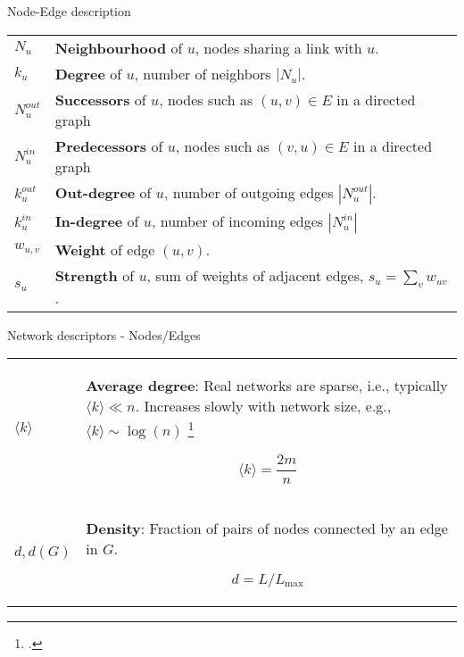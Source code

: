 \begin{textbox}{Node-Edge description}
    \begin{tabular}{p{}|p{}}\scriptsize

        $N_u$       & \textbf{Neighbourhood} of $u$, nodes sharing a link with $u$.                      \\


        $k_u$       & \textbf{Degree} of $u$, number of neighbors $|N_u|$.                               \\
        \hline
        $N^{out}_u$ & \textbf{Successors} of $u$, nodes such as $(u,v)\in E$ in a directed graph         \\

        $N^{in}_u$  & \textbf{Predecessors} of $u$, nodes such as $(v,u)\in E$ in a directed graph       \\

        $k^{out}_u$ & \textbf{Out-degree} of $u$, number of outgoing edges  $|N^{out}_u|$.               \\

        $k^{in}_u$  & \textbf{In-degree} of $u$, number of incoming edges $|N^{in}_u|$                   \\

        \hline

        $w_{u,v}$   & \textbf{Weight} of edge $(u,v)$.                                                   \\

        $s_u$       & \textbf{Strength} of $u$, sum of weights of adjacent edges, $s_u = \sum_v w_{uv}$. \\
    \end{tabular}

\end{textbox}

\begin{textbox}{Network descriptors - Nodes/Edges}
    \begin{tabular}{p{}|p{}}\scriptsize

        $\langle k \rangle$ & \textbf{Average degree}:
        Real networks are sparse, i.e., typically $\langle k \rangle \ll n$. Increases slowly with network size, e.g., $\langle k \rangle \sim \log(n)$ \footcite{leskovec2005graphs}

        \[\langle k \rangle=\frac{2m}{n}\]                                                              \\

        $d,d(G)$            & \textbf{Density}: Fraction of pairs of nodes connected by an edge in $G$.

        \[d=L/L_{\max}
        \]                                                                                              \\
    \end{tabular}
\end{textbox}

